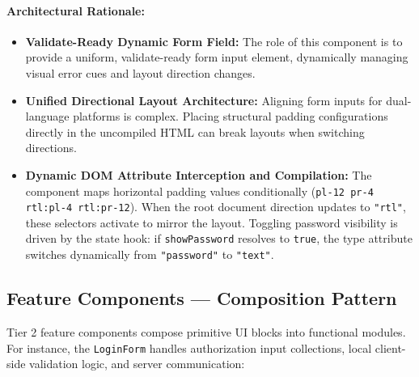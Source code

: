 \documentclass[12pt,a4paper]{article}
\begin{document}
\paragraph{Architectural Rationale:}
\begin{itemize}[leftmargin=2em]
    \item \textbf{Validate-Ready Dynamic Form Field:} The role of this component is to provide a uniform, validate-ready form input element, dynamically managing visual error cues and layout direction changes.
    \item \textbf{Unified Directional Layout Architecture:} Aligning form inputs for dual-language platforms is complex. Placing structural padding configurations directly in the uncompiled HTML can break layouts when switching directions.
    \item \textbf{Dynamic DOM Attribute Interception and Compilation:} The component maps horizontal padding values conditionally (\texttt{pl-12 pr-4 rtl:pl-4 rtl:pr-12}). When the root document direction updates to \texttt{"rtl"}, these selectors activate to mirror the layout. Toggling password visibility is driven by the state hook: if \texttt{showPassword} resolves to \texttt{true}, the type attribute switches dynamically from \texttt{"password"} to \texttt{"text"}.
\end{itemize}

\subsection{Feature Components — Composition Pattern}

Tier 2 feature components compose primitive UI blocks into functional modules. For instance, the \texttt{LoginForm} handles authorization input collections, local client-side validation logic, and server communication:
\end{document}
